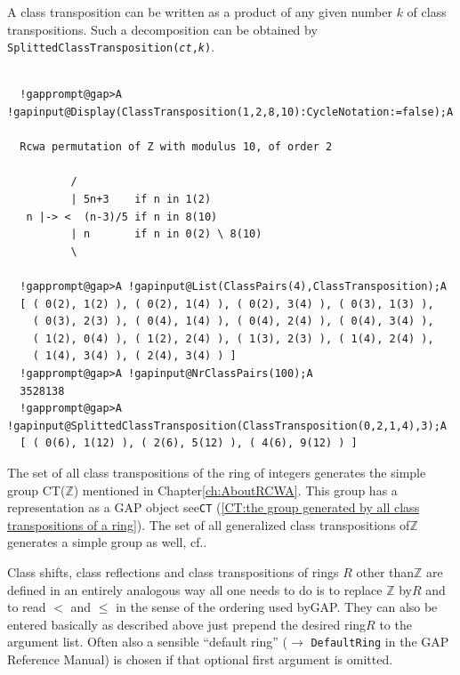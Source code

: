 \documentclass[a4paper,11pt]{report}
\begin{document}
{{{  A class transposition can be written as a product of any given number $k$ of class transpositions. Such a decomposition can be obtained by \texttt{SplittedClassTransposition(\mbox{\texttt{\mdseries\slshape ct}},\mbox{\texttt{\mdseries\slshape k}})}. 

 
\begin{Verbatim}[commandchars=!@A,fontsize=\small,frame=single,label=Example]
  
  !gapprompt@gap>A !gapinput@Display(ClassTransposition(1,2,8,10):CycleNotation:=false);A
  
  Rcwa permutation of Z with modulus 10, of order 2
  
          /
          | 5n+3    if n in 1(2)
   n |-> <  (n-3)/5 if n in 8(10)
          | n       if n in 0(2) \ 8(10)
          \
  
  !gapprompt@gap>A !gapinput@List(ClassPairs(4),ClassTransposition);A
  [ ( 0(2), 1(2) ), ( 0(2), 1(4) ), ( 0(2), 3(4) ), ( 0(3), 1(3) ), 
    ( 0(3), 2(3) ), ( 0(4), 1(4) ), ( 0(4), 2(4) ), ( 0(4), 3(4) ), 
    ( 1(2), 0(4) ), ( 1(2), 2(4) ), ( 1(3), 2(3) ), ( 1(4), 2(4) ), 
    ( 1(4), 3(4) ), ( 2(4), 3(4) ) ]
  !gapprompt@gap>A !gapinput@NrClassPairs(100);A
  3528138
  !gapprompt@gap>A !gapinput@SplittedClassTransposition(ClassTransposition(0,2,1,4),3);A
  [ ( 0(6), 1(12) ), ( 2(6), 5(12) ), ( 4(6), 9(12) ) ]
\end{Verbatim}
 }

 \noindent The set of all class transpositions of the ring of integers generates the
simple group CT({\ensuremath{\mathbb Z}}) mentioned in Chapter{\nobreakspace}\ref{ch:AboutRCWA}. This group has a representation as a \textsf{GAP} object \texttt{}\texttt{} see{\nobreakspace}\texttt{CT} (\ref{CT:the group generated by all class transpositions of a ring}). The set of all generalized class transpositions
of{\nobreakspace}{\ensuremath{\mathbb Z}} generates a simple group as well,
cf.{\nobreakspace}\cite{Kohl09}. 

 Class shifts, class reflections and class transpositions of rings $R$ other than{\nobreakspace}{\ensuremath{\mathbb Z}} are defined in an entirely
analogous way \texttt{}\texttt{} all one needs to do is
to replace {\ensuremath{\mathbb Z}} by{\nobreakspace}$R$ and to read $<$ and $\leq$ in the sense of the ordering used by{\nobreakspace}\textsf{GAP}. They can also be entered basically as described above
\texttt{}\texttt{} just prepend the desired
ring{\nobreakspace}$R$ to the argument list. Often also a sensible ``default ring'' ($\rightarrow$ \texttt{DefaultRing} in the \textsf{GAP} Reference Manual) is chosen if that optional first argument is omitted. 

}}
\end{document}
